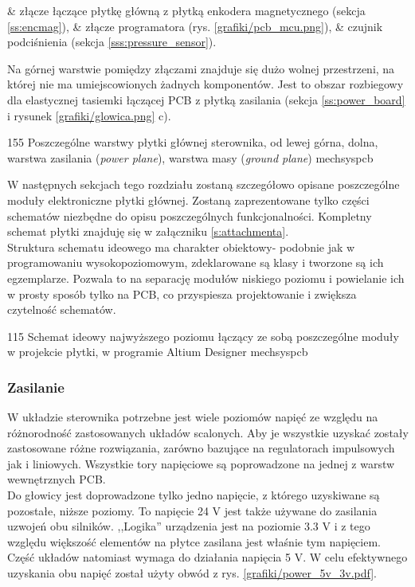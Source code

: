 \begin{easylist}
	& złącze łączące płytkę główną z płytką enkodera magnetycznego (sekcja \ref{ss:encmag}),
	& złącze programatora (rys. \ref{grafiki/pcb_mcu.png}), 
	& czujnik podciśnienia (sekcja \ref{sss:pressure_sensor}).
	\\
\end{easylist}

Na górnej warstwie pomiędzy złączami znajduje się dużo wolnej przestrzeni, na której nie ma umiejscowionych żadnych komponentów. Jest to obszar rozbiegowy dla elastycznej tasiemki łączącej PCB z płytką zasilania (sekcja \ref{ss:power_board} i rysunek \ref{grafiki/glowica.png} c).

	{155}
	{Poszczególne warstwy płytki głównej sterownika, od lewej górna, dolna, warstwa zasilania ({\it power plane}), warstwa masy ({\it ground plane})}
	{mechsyspcb}

W następnych sekcjach tego rozdziału zostaną szczegółowo opisane poszczególne moduły elektroniczne płytki głównej. Zostaną zaprezentowane tylko części schematów niezbędne do opisu poszczególnych funkcjonalności. Kompletny schemat płytki znajduję się w załączniku \ref{s:attachmenta}. \\
	
Struktura schematu ideowego ma charakter obiektowy- podobnie jak w programowaniu wysokopoziomowym, zdeklarowane są klasy i tworzone są ich egzemplarze. Pozwala to na separację modułów niskiego poziomu i powielanie ich w prosty sposób tylko na PCB, co przyspiesza projektowanie i zwiększa czytelność schematów.

	{115}
	{Schemat ideowy najwyższego poziomu łączący ze sobą poszczególne moduły w projekcie płytki, w programie Altium Designer}
	{mechsyspcb}

\subsubsection{Zasilanie}

W układzie sterownika potrzebne jest wiele poziomów napięć ze względu na różnorodność zastosowanych układów scalonych. Aby je wszystkie uzyskać zostały zastosowane różne rozwiązania, zarówno bazujące na regulatorach impulsowych jak i liniowych. Wszystkie tory napięciowe są poprowadzone na jednej z warstw wewnętrznych PCB. \\

Do głowicy jest doprowadzone tylko jedno napięcie, z którego uzyskiwane są pozostałe, niższe poziomy. To napięcie 24 V  jest także używane do zasilania uzwojeń obu silników. ,,Logika'' urządzenia jest na poziomie 3.3 V i z tego względu większość elementów na płytce zasilana jest właśnie tym napięciem. Część układów natomiast wymaga do działania napięcia 5 V. W celu efektywnego uzyskania obu napięć został użyty obwód z rys. \ref{grafiki/power_5v_3v.pdf}. \\

